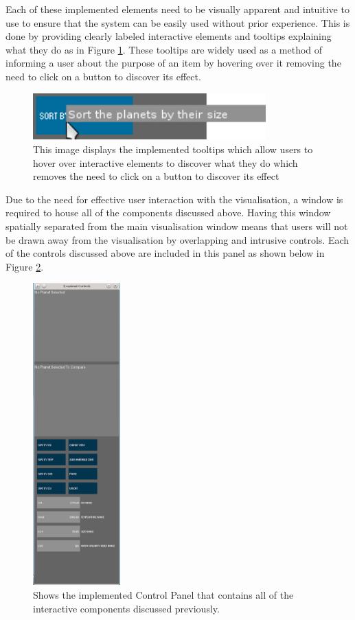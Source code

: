 Each of these implemented elements need to be visually apparent and intuitive to
use to ensure that the system can be
easily used without prior experience. This is done by providing clearly
labeled interactive elements and tooltips explaining what they
do as in Figure \ref{fig:tooltip}. These tooltips are widely used as a method of
informing a
user about the purpose of an item by hovering over it removing the need to
click on a button to discover its effect.

\begin{figure}[H]
  \centering
      \includegraphics[width=0.8\textwidth]{images/tooltip.jpg}
  \caption[Tooltip on hover]{This image displays the implemented tooltips which
allow users to hover over interactive elements to discover what they do which
removes the need to
click on a button to discover its effect}
  \label{fig:tooltip}
\end{figure}

Due to the need for effective user interaction with the visualisation, a window
is required to house all of the components discussed above. Having this window
spatially separated from the main visualisation window means that users will not
be drawn away from the visualisation by overlapping and intrusive controls. Each
of the controls discussed above are included in this panel as shown below in
Figure \ref{fig:nav}.

\begin{figure}[H]
  \centering
      \includegraphics[width=0.3\textwidth]{images/nav.png}
  \caption[Implementation of Control Panel]{Shows the implemented Control Panel
that contains all of the interactive components discussed previously.}
  \label{fig:nav}
\end{figure}

